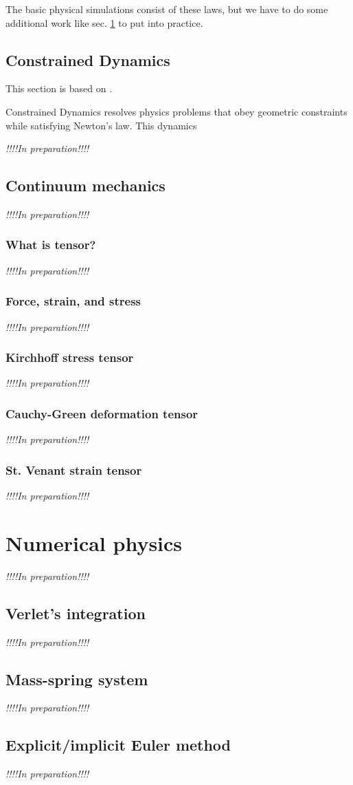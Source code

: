 \documentclass[pdflatex,sn-mathphys-num]{sn-jnl}%
\theoremstyle{thmstyleone}%
\theoremstyle{thmstyletwo}%
\theoremstyle{thmstylethree}%
\newcommand{\inprep}{
	\begin{center}
		\sl\rm {!!!!In preparation!!!!}
\end{center}}
\begin{document}
The basic physical simulations consist of these laws, but we have to do some additional work like sec. \ref{NumPhys} to put into practice.

\subsection{Constrained Dynamics}
This section is based on \cite{ConstrainedWitkin}.

Constrained Dynamics resolves physics problems that obey geometric constraints while satisfying Newton's law. This dynamics 

\inprep
\subsection{Continuum mechanics}
\inprep
\subsubsection{What is tensor?}
\inprep
\subsubsection{Force, strain, and stress}
\inprep
\subsubsection{Kirchhoff stress tensor}
\inprep
\subsubsection{Cauchy-Green deformation tensor}
\inprep
\subsubsection{St. Venant strain tensor}
\inprep

\section{Numerical physics}\label{NumPhys}
\inprep
\subsection{Verlet's integration}
\inprep
\subsection{Mass-spring system}
\inprep
\subsection{Explicit/implicit Euler method}
\inprep
\end{document}

